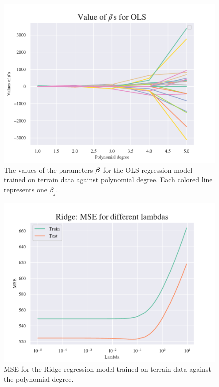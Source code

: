 \begin{figure}[H]
    \centering
    \includegraphics[width=1\linewidth]{project_1/figures/figures_in_appendix/OLS_Betas_terrain.pdf}
    \caption{The values of the parameters $\boldsymbol{\beta}$ for the OLS regression model trained on terrain data against polynomial degree. Each colored line represents one $\beta_j$.}
    \label{fig:ref9}
\end{figure}


\begin{figure}[H]
    \centering
    \includegraphics[width=1\linewidth]{project_1/figures/figures_in_appendix/Ridge_MSE_terrain.pdf}
    \caption{MSE for the Ridge regression model trained on terrain data against the polynomial degree.}
    \label{fig:ref10}
\end{figure}

